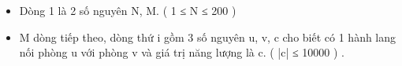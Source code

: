 \begin{itemize}
	\item Dòng 1 là 2 số nguyên N, M. ( 1 ≤ N ≤ 200 )
	\item M dòng tiếp theo, dòng thứ i gồm 3 số nguyên u, v, c cho biết có 1 hành lang nối phòng u với phòng v và giá trị năng lượng là c. ( |c| ≤ 10000 ) .
\end{itemize}
